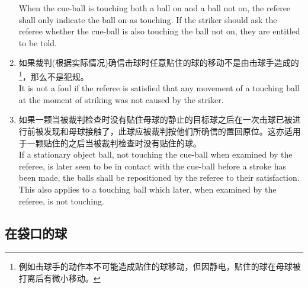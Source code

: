 \begin{enumerate}[label=(\alph*)]
    When the cue-ball is touching both a ball on and a ball not on, the referee shall only indicate the ball on as touching. If the striker should ask the referee whether the cue-ball is also touching the ball not on, they are entitled to be told.
    \item 如果裁判(根据实际情况)确信击球时任意贴住的球的移动不是由击球手造成的\footnote{例如击球手的动作本不可能造成贴住的球移动，但因静电，贴住的球在母球被打离后有微小移动。}，那么不是犯规。\\
    It is not a foul if the referee is satisfied that any movement of a touching ball at the moment of striking was not caused by the striker.
    \item 如果一颗当被裁判检查时没有贴住母球的静止的目标球之后在一次击球已被进行前被发现和母球接触了，此球应被裁判按他们所确信的置回原位。这亦适用于一颗贴住的之后当被裁判检查时没有贴住的球。\\
    If a stationary object ball, not touching the cue-ball when examined by the referee, is later seen to be in contact with the cue-ball before a stroke has been made, the balls shall be repositioned by the referee to their satisfaction. This also applies to a touching ball which later, when examined by the referee, is not touching.
\end{enumerate}

\subsection{在袋口的球}\label{2239}

